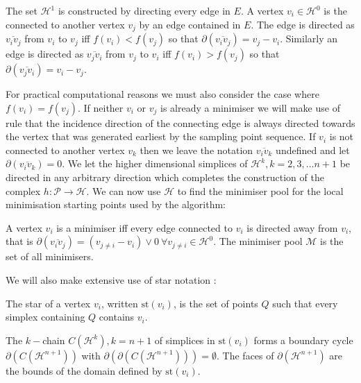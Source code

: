
\begin{definition} \label{def:h3}
The set $\mathcal{H}^1$ is constructed by directing every edge in $E$. A vertex $v_i \in \mathcal{H}^0$ is the connected to another vertex $v_j$ by an edge contained in $E$. The edge is directed as $\overline{v_i v_j}$ from $v_i$ to $v_j$ iff $f(v_i) < f(v_j)$ so that $\partial \left( \overline{v_i v_j} \right) = v_j - v_i$. Similarly an edge is directed as $\overline{v_j v_i}$ from $v_j$ to $v_i$ iff $f(v_i) > f(v_j)$ so that $\partial \left( \overline{v_j v_i} \right) = v_i - v_j$.
\end{definition}

For practical computational reasons we must also consider the case where $f(v_i) = f(v_j)$. If neither $v_i$ or $v_j$ is already a minimiser we will make use of rule that the incidence direction of the connecting edge is always directed towards the vertex that was generated earliest by the sampling point sequence. If $v_i$ is not connected to another vertex $v_k$ then we leave the notation $\overline{v_i v_k}$ undefined and let $\partial \left(\overline{v_i v_k}\right) = 0$. We let the higher dimensional simplices of $\mathcal{H}^k, k = 2, 3, \dots n + 1$ be directed in any arbitrary direction which completes the construction of the complex $h: \mathcal{P}\rightarrow \mathcal{H}$. We can now use $\mathcal{H}$ to find the minimiser pool for the local minimisation starting points used by the algorithm:

\begin{definition} \label{def:h4}
A vertex $v_i$ is a minimiser iff every edge connected to $v_i$ is directed away from $v_i$, that is $\partial \left( \overline{v_i v_j} \right) = (v_{j \neq i} - v_i) \lor 0~ \forall v_{j \neq i} \in \mathcal{H}^0$. The minimiser pool $\mathcal{M}$ is the set of all minimisers.
\end{definition}


We will also make extensive use of star notation \citep{Hatcher2011, Henle1979}:
\begin{definition} \label{def:h5}
The star of a vertex $v_i$, written $\textrm{st}\left( v_i \right)$, is the set of points $Q$ such that every simplex containing $Q$ contains $v_i$. \
\end{definition}
The $k-$chain $C(\mathcal{H}^k), k = n + 1$ of simplices in $\textrm{st}\left( v_i \right)$ forms a boundary cycle $\partial(C(\mathcal{H}^{n + 1}))$ with $\partial\left(\partial(C(\mathcal{H}^{n + 1}))\right) = \emptyset$. The faces of $\partial(\mathcal{H}^{n + 1})$ are the bounds of the domain defined by $\textrm{st}\left( v_i \right)$.

